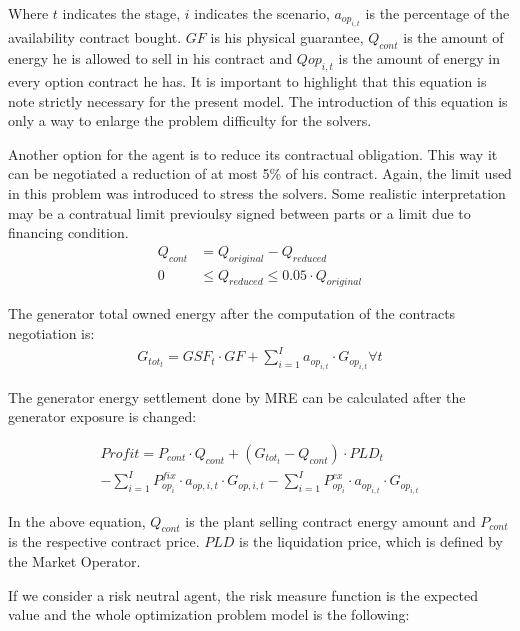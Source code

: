 \documentclass[a4paper]{IEEEtran}
\begin{document}
Where $t$ indicates the stage, $i$ indicates the scenario, $a_{op_{i,t}}$ is the percentage of the availability contract bought. $GF$ is his physical guarantee, $Q_{cont}$ is the amount of energy he is allowed to sell in his contract and $Q{op_{i,t}}$ is the amount of energy in every option contract he has. It is important to highlight that this equation is note strictly necessary for the present model. The introduction of this equation is only a way to enlarge the problem difficulty for the solvers.

Another option for the agent is to reduce its contractual obligation. This way it can be negotiated a reduction of at most 5\% of his contract. Again, the limit used in this problem was introduced to stress the solvers. Some realistic interpretation may be a contratual limit previoulsy signed between parts or a limit due to financing condition.
\begin{align}
	Q_{cont} &= Q_{original} - Q_{reduced}\\
	0 &\leq Q_{reduced} \leq 0.05 \cdot Q_{original}
\end{align}

The generator total owned energy after the computation of the contracts negotiation is:
\begin{align}
	G_{tot_t} = GSF_t \cdot GF + \sum_{i=1}^{I} a_{op_{i,t}} \cdot G_{op_{i,t}} \forall t
\end{align}

The generator energy settlement done by MRE can be calculated after the generator exposure is changed:

\begin{equation}
\begin{split}
	Profit = P_{cont} \cdot Q_{cont} + (G_{tot_t} - Q_{cont}) \cdot PLD_t  \\
	 - \sum_{i=1}^{I} P^{fix}_{op_i} \cdot a_{op,i,t} \cdot G_{op,i,t} - \sum_{i=1}^{I} P^{ex}_{op_i} \cdot a_{op_{i,t}} \cdot G_{op_{i,t}}
	\end{split}
\end{equation}

 In the above equation, $Q_{cont}$ is the plant selling contract energy amount and $P_{cont}$ is the respective contract price. $PLD$ is the liquidation price, which is defined by the Market Operator.

If we consider a risk neutral agent, the risk measure function is the expected value and the whole optimization problem model is the following:
\end{document}
